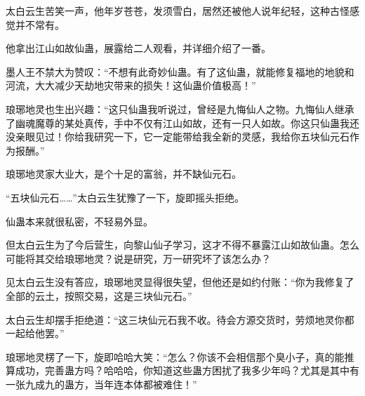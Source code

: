 \begin{this_body}
太白云生苦笑一声，他年岁苍苍，发须雪白，居然还被他人说年纪轻，这种古怪感觉并不常有。

他拿出江山如故仙蛊，展露给二人观看，并详细介绍了一番。

墨人王不禁大为赞叹：“不想有此奇妙仙蛊。有了这仙蛊，就能修复福地的地貌和河流，大大减少天劫地灾带来的损失！这仙蛊价值极高！”

琅琊地灵也生出兴趣：“这只仙蛊我听说过，曾经是九悔仙人之物。九悔仙人继承了幽魂魔尊的某处真传，手中不仅有江山如故，还有一只人如故。你这只仙蛊我还没亲眼见过！你给我研究一下，它一定能带给我全新的灵感，我给你五块仙元石作为报酬。”

琅琊地灵家大业大，是个十足的富翁，并不缺仙元石。

“五块仙元石……”太白云生犹豫了一下，旋即摇头拒绝。

仙蛊本来就很私密，不轻易外显。

但太白云生为了今后营生，向黎山仙子学习，这才不得不暴露江山如故仙蛊。怎么可能将其交给琅琊地灵？说是研究，万一研究坏了该怎么办？

见太白云生没有答应，琅琊地灵显得很失望，但他还是如约付账：“你为我修复了全部的云土，按照交易，这是三块仙元石。”

太白云生却摆手拒绝道：“这三块仙元石我不收。待会方源交货时，劳烦地灵你都一起给他罢。”

琅琊地灵楞了一下，旋即哈哈大笑：“怎么？你该不会相信那个臭小子，真的能推算成功，完善蛊方吗？哈哈哈，你知道这些蛊方困扰了我多少年吗？尤其是其中有一张九成九的蛊方，当年连本体都被难住！”

\end{this_body}

